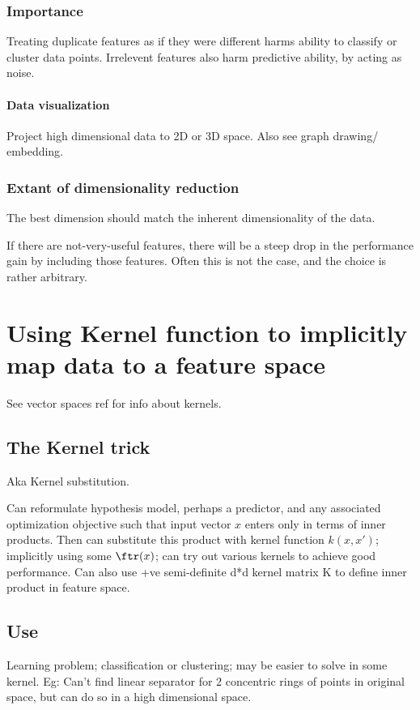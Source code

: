 \documentclass[oneside, article]{memoir}
\begin{document}
\subsubsection{Importance}
Treating duplicate features as if they were different harms ability to classify or cluster data points. Irrelevent features also harm predictive ability, by acting as noise.

\paragraph*{Data visualization}
Project high dimensional data to 2D or 3D space. Also see graph drawing/ embedding.

\subsubsection{Extant of dimensionality reduction}
The best dimension should match the  inherent dimensionality of the data.

If there are not-very-useful features, there will be a steep drop in the performance gain by including those features. Often this is not the case, and the choice is rather arbitrary.

\section{Using Kernel function to implicitly map data to a feature space}
See vector spaces ref for info about kernels.

\subsection{The Kernel trick}
Aka Kernel substitution.

Can reformulate hypothesis model, perhaps a predictor, and any associated optimization objective such that input vector $x$ enters only in terms of inner products. Then can substitute this product with kernel function $k(x, x')$; implicitly using some $\ftr(x)$; can try out various kernels to achieve good performance. Can also use +ve semi-definite d*d kernel matrix K to define inner product in feature space.

\subsection{Use}
Learning problem; classification or clustering; may be easier to solve in some kernel. Eg: Can't find linear separator for 2 concentric rings of points in original space, but can do so in a high dimensional space.
\end{document}
